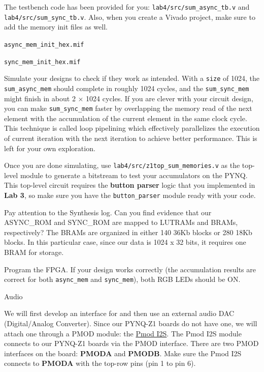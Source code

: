 \documentclass[11pt]{article}
\makeatletter
\renewcommand{\section}
{\@startsection {section}{1}{0pt}
 {-2ex}
 {1ex}
 {\bfseries\Large}}
\makeatother
\begin{document}
The testbench code has been provided for you: \verb|lab4/src/sum_async_tb.v| and \verb|lab4/src/sum_sync_tb.v|.
Also, when you create a Vivado project, make sure to add the memory init files as well.

\verb|async_mem_init_hex.mif|

\verb|sync_mem_init_hex.mif|

Simulate your designs to check if they work as intended.
With a \verb|size| of 1024, the \verb|sum_async_mem| should complete in roughly 1024 cycles, and the \verb|sum_sync_mem| might finish in about 2 $\times$ 1024 cycles. If you are clever with your circuit design, you can make \verb|sum_sync_mem| faster by overlapping the memory read of the next element with the accumulation of the current element in the same clock cycle. This technique is called loop pipelining which effectively parallelizes the execution of current iteration with the next iteration to achieve better performance. This is left for your own exploration.

Once you are done simulating, use \verb|lab4/src/z1top_sum_memories.v| as the top-level module to generate a bitstream to test your accumulators on the PYNQ. This top-level circuit requires the \textbf{button parser} logic that you implemented in \textbf{Lab 3}, so make sure you have the \verb|button_parser| module ready with your code.

Pay attention to the Synthesis log. Can you find evidence that our ASYNC\_ROM and SYNC\_ROM are mapped to LUTRAMs and BRAMs, respectively? The BRAMs are organized in either 140 36Kb blocks or 280 18Kb blocks. In this particular case, since our data is 1024 x 32 bits, it requires one BRAM for storage.

Program the FPGA. If your design works correctly (the accumulation results are correct for both \verb|async_mem| and \verb|sync_mem|), both RGB LEDs should be ON.

\section{Audio}

We will first develop an interface for and then use an external audio DAC (Digital/Analog Converter). Since our PYNQ-Z1 boards do not have one, we will attach one through a PMOD module: the \href{https://reference.digilentinc.com/reference/pmod/pmodi2s/reference-manual}{Pmod I2S}. The Pmod I2S module connects to our PYNQ-Z1 boards via the PMOD interface. There are two PMOD interfaces on the board: \textbf{PMODA} and \textbf{PMODB}. Make sure the Pmod I2S connects to \textbf{PMODA} with the top-row pins (pin 1 to pin 6).
\end{document}
